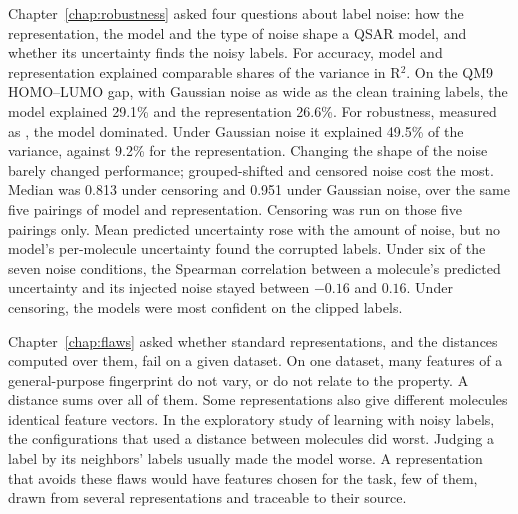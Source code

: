 Chapter~\ref{chap:robustness} asked four questions about label noise: how the representation, the model and the type of noise shape a QSAR model, and whether its uncertainty finds the noisy labels. For accuracy, model and representation explained comparable shares of the variance in R$^2$. On the QM9 HOMO--LUMO gap, with Gaussian noise as wide as the clean training labels, the model explained 29.1\% and the representation 26.6\%. For robustness, measured as \aucnorm, the model dominated. Under Gaussian noise it explained 49.5\% of the variance, against 9.2\% for the representation. Changing the shape of the noise barely changed performance; grouped-shifted and censored noise cost the most. Median \aucnorm{} was 0.813 under censoring and 0.951 under Gaussian noise, over the same five pairings of model and representation. Censoring was run on those five pairings only. Mean predicted uncertainty rose with the amount of noise, but no model's per-molecule uncertainty found the corrupted labels. Under six of the seven noise conditions, the Spearman correlation between a molecule's predicted uncertainty and its injected noise stayed between $-0.16$ and $0.16$. Under censoring, the models were most confident on the clipped labels.

Chapter~\ref{chap:flaws} asked whether standard representations, and the distances computed over them, fail on a given dataset. On one dataset, many features of a general-purpose fingerprint do not vary, or do not relate to the property. A distance sums over all of them. Some representations also give different molecules identical feature vectors. In the exploratory study of learning with noisy labels, the configurations that used a distance between molecules did worst. Judging a label by its neighbors' labels usually made the model worse. A representation that avoids these flaws would have features chosen for the task, few of them, drawn from several representations and traceable to their source.

